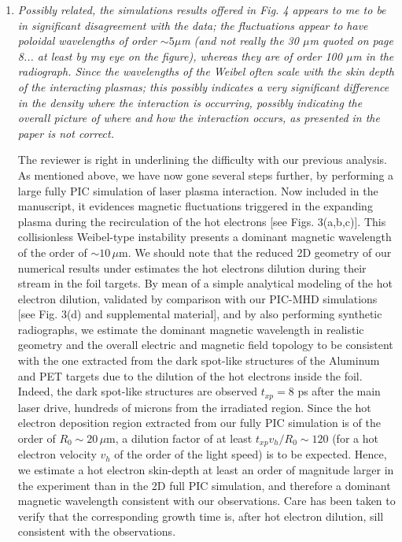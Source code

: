 \documentclass[aps,showpacs,superscriptaddress]{revtex4}%
\begin{document}
\begin{enumerate}
\item \textit{Possibly related, the simulations results offered in Fig. 4 appears to me to be in significant disagreement with the data; the fluctuations appear to have poloidal wavelengths of order $\sim 5 \mu$m (and not really the 30 $\mu$m quoted on page 8... at least by my eye on the figure), whereas they are of order 100 $\mu$m in the radiograph. Since the wavelengths of the Weibel often scale with the skin depth of the interacting plasmas; this possibly indicates a very significant difference in the density where the interaction is occurring, possibly indicating the overall picture of where and how the interaction occurs, as presented in the paper is not correct. }

The reviewer is right in underlining the difficulty with our previous analysis. As mentioned above, we have now gone several steps further, by performing a  large fully PIC simulation of laser plasma interaction. Now included in the manuscript, it evidences magnetic fluctuations triggered in the expanding plasma during the recirculation of the hot electrons [see Figs. 3(a,b,c)]. This collisionless Weibel-type instability presents a dominant magnetic wavelength of the order of $\sim 10 \, \mu$m.
We should note that the reduced 2D geometry of our numerical results under estimates the hot electrons dilution during their stream in the foil targets. 
By mean of a simple analytical modeling of the hot electron dilution, validated by comparison with our PIC-MHD simulations [see Fig. 3(d) and supplemental material], and by also performing synthetic radiographs, we  estimate the  dominant magnetic wavelength in realistic geometry and the overall electric and magnetic field topology to be consistent with the one extracted from the dark spot-like structures of the Aluminum  and PET targets due to the dilution of the hot electrons inside the foil.
Indeed, the dark spot-like structures are observed $t_{xp}   = 8$ ps   after the main laser drive, hundreds of  microns from the irradiated region.
Since the hot electron deposition region extracted from our fully PIC simulation is of the order of $R_0\sim 20\, \mu$m, 
a dilution factor of at least $t_{xp} v_h / R_0 \sim 120$ (for a hot electron velocity $v_h$ of the order of  the light speed) is to be expected. Hence, we estimate a hot electron skin-depth at least  an order of magnitude larger in the experiment than in the 2D full PIC simulation,  and therefore a dominant magnetic wavelength consistent with our observations.
Care has been taken to verify that the corresponding growth time is, after hot electron dilution, sill consistent with the observations.


\end{enumerate}
\end{document}
